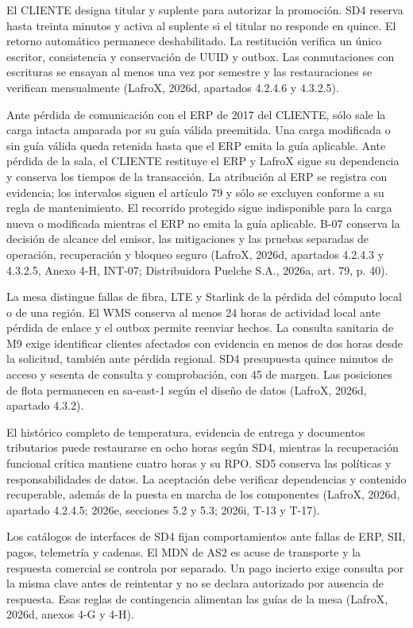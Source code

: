 El CLIENTE designa titular y suplente para autorizar la promoción. SD4 reserva hasta treinta minutos y activa al suplente si el titular no responde en quince. El retorno automático permanece deshabilitado. La restitución verifica un único escritor, consistencia y conservación de UUID y outbox. Las conmutaciones con escrituras se ensayan al menos una vez por semestre y las restauraciones se verifican mensualmente (LafroX, 2026d, apartados 4.2.4.6 y 4.3.2.5).

Ante pérdida de comunicación con el ERP de 2017 del CLIENTE, sólo sale la carga intacta amparada por su guía válida preemitida. Una carga modificada o sin guía válida queda retenida hasta que el ERP emita la guía aplicable. Ante pérdida de la sala, el CLIENTE restituye el ERP y LafroX sigue su dependencia y conserva los tiempos de la transacción. La atribución al ERP se registra con evidencia; los intervalos siguen el artículo 79 y sólo se excluyen conforme a su regla de mantenimiento. El recorrido protegido sigue indisponible para la carga nueva o modificada mientras el ERP no emita la guía aplicable. B-07 conserva la decisión de alcance del emisor, las mitigaciones y las pruebas separadas de operación, recuperación y bloqueo seguro (LafroX, 2026d, apartados 4.2.4.3 y 4.3.2.5, Anexo 4-H, INT-07; Distribuidora Puelche S.A., 2026a, art. 79, p. 40).

La mesa distingue fallas de fibra, LTE y Starlink de la pérdida del cómputo local o de una región. El WMS conserva al menos 24 horas de actividad local ante pérdida de enlace y el outbox permite reenviar hechos. La consulta sanitaria de M9 exige identificar clientes afectados con evidencia en menos de dos horas desde la solicitud, también ante pérdida regional. SD4 presupuesta quince minutos de acceso y sesenta de consulta y comprobación, con 45 de margen. Las posiciones de flota permanecen en sa-east-1 según el diseño de datos (LafroX, 2026d, apartado 4.3.2).

El histórico completo de temperatura, evidencia de entrega y documentos tributarios puede restaurarse en ocho horas según SD4, mientras la recuperación funcional crítica mantiene cuatro horas y su RPO. SD5 conserva las políticas y responsabilidades de datos. La aceptación debe verificar dependencias y contenido recuperable, además de la puesta en marcha de los componentes (LafroX, 2026d, apartado 4.2.4.5; 2026e, secciones 5.2 y 5.3; 2026i, T-13 y T-17).

Los catálogos de interfaces de SD4 fijan comportamientos ante fallas de ERP, SII, pagos, telemetría y cadenas. El MDN de AS2 es acuse de transporte y la respuesta comercial se controla por separado. Un pago incierto exige consulta por la misma clave antes de reintentar y no se declara autorizado por ausencia de respuesta. Esas reglas de contingencia alimentan las guías de la mesa (LafroX, 2026d, anexos 4-G y 4-H).

